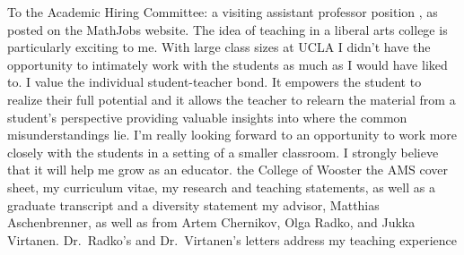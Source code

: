 \documentclass[11pt]{letter}
\begin{document}



\def\teachliberalart{{The idea of teaching in a liberal arts college is particularly exciting to me.
With large class sizes at UCLA I didn't have the opportunity to intimately work with the students as much as I would have liked to.
I value the individual student-teacher bond.
It empowers the student to realize their full potential and it allows the teacher to relearn the material from a student's perspective providing valuable insights into where the common misunderstandings lie.
I'm really looking forward to an opportunity to work more closely with the students in a setting of a smaller classroom.
I strongly believe that it will help me grow as an educator.
}}
\def\joint{{

Unfortunately I will not be able to attend the joint AMS/MAA meetings this year.}}

\def\recommendation{{my advisor, Matthias Aschenbrenner, as well as from Artem Chernikov, Olga Radko, and Jukka Virtanen. Dr.~Radko's and Dr.~Virtanen's letters address my teaching experience}}
\def\teachrecommendation{{Olga Radko and Jukka Virtanen addressing my teaching experience}}

\def\mathjobs{{, as posted on the MathJobs website.}}

\def\generic {{the AMS cover sheet, my curriculum vitae, my research and teaching statements}}
\def\noresearch {{the AMS cover sheet, my curriculum vitae, and my teaching statement}}
\def\publication {{the AMS cover sheet, curriculum vitae, publication list, my research and teaching statements}}

\def\genintro{{To the Academic Hiring Committee:}}
\def\lecture{{a lecturer position in mathematics}}

 

\coverletter
  {}
  {\genintro}
  {a visiting assistant professor position}
  {\mathjobs}
  {\teachliberalart}
  {the College of Wooster}
  {\generic, as well as a graduate transcript and a diversity statement}
  {\recommendation}
\end{document}
